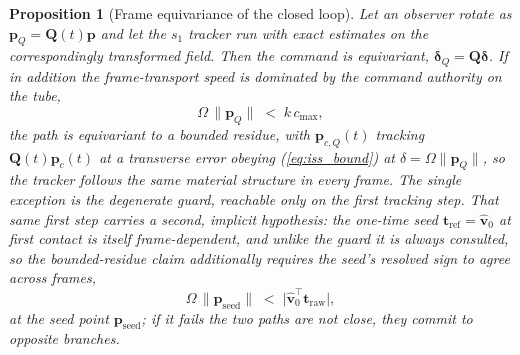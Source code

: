 \documentclass[lettersize,journal]{IEEEtran}
\newtheorem{proposition}{Proposition}
\begin{document}
\begin{proposition}[Frame equivariance of the closed loop]
\label{prop:equivariance}
Let an observer rotate as $\mathbf{p}_Q = \mathbf{Q}(t)\mathbf{p}$ and
let the $s_1$ tracker run with exact estimates on the correspondingly
transformed field. Then the command is equivariant,
$\boldsymbol{\delta}_Q = \mathbf{Q}\boldsymbol{\delta}$. If in addition
the frame-transport speed is dominated by the command authority on the
tube,
\begin{equation}
    \Omega\,\lVert\mathbf{p}_Q\rVert \;<\; k\,c_{\max} ,
    \label{eq:transport_cond}
\end{equation}
the path is equivariant to a bounded residue, with
$\mathbf{p}_{c,Q}(t)$ tracking $\mathbf{Q}(t)\mathbf{p}_c(t)$ at a
transverse error obeying
(\ref{eq:iss_bound}) at $\delta = \Omega\lVert\mathbf{p}_Q\rVert$, so the
tracker follows the same material structure in every frame. The single
exception is the degenerate guard, reachable only on the first tracking
step. That same first step carries a second, implicit hypothesis: the
one-time seed $\mathbf{t}_{\text{ref}} = \hat{\mathbf{v}}_0$ at first
contact is itself frame-dependent, and unlike the guard it is always
consulted, so the bounded-residue claim additionally requires the seed's
resolved sign to agree across frames,
\begin{equation}
    \Omega\,\lVert\mathbf{p}_{\text{seed}}\rVert \;<\; \lvert\hat{\mathbf{v}}_0^\top\mathbf{t}_{\text{raw}}\rvert,
    \label{eq:seed_cond}
\end{equation}
at the seed point $\mathbf{p}_{\text{seed}}$; if it fails the two paths
are not close, they commit to opposite branches.
\end{proposition}
\end{document}
